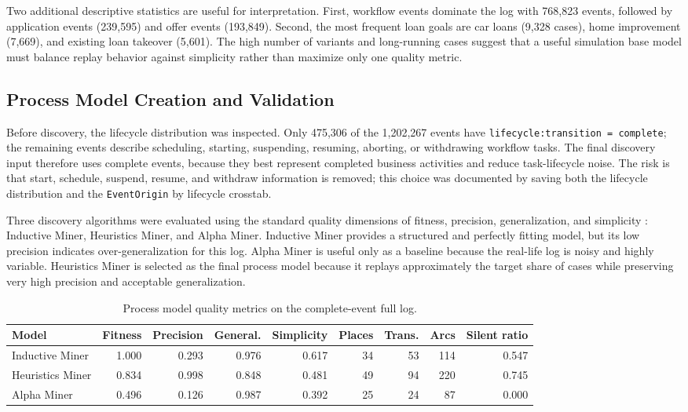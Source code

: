 \documentclass[
  english,
  font=times,
  twocolumn,
]{tumarticle}
\begin{document}
Two additional descriptive statistics are useful for interpretation.
First, workflow events dominate the log with 768,823 events, followed by application events (239,595) and offer events (193,849).
Second, the most frequent loan goals are car loans (9,328 cases), home improvement (7,669), and existing loan takeover (5,601).
The high number of variants and long-running cases suggest that a useful simulation base model must balance replay behavior against simplicity rather than maximize only one quality metric.

\subsection{Process Model Creation and Validation}

Before discovery, the lifecycle distribution was inspected.
Only 475,306 of the 1,202,267 events have \texttt{lifecycle:transition = complete}; the remaining events describe scheduling, starting, suspending, resuming, aborting, or withdrawing workflow tasks.
The final discovery input therefore uses complete events, because they best represent completed business activities and reduce task-lifecycle noise.
The risk is that start, schedule, suspend, resume, and withdraw information is removed; this choice was documented by saving both the lifecycle distribution and the \texttt{EventOrigin} by lifecycle crosstab.

Three discovery algorithms were evaluated using the standard quality dimensions of fitness, precision, generalization, and simplicity \cite{vanderAalst2016process,carmona2018conformance}: Inductive Miner, Heuristics Miner, and Alpha Miner.
Inductive Miner provides a structured and perfectly fitting model, but its low precision indicates over-generalization for this log.
Alpha Miner is useful only as a baseline because the real-life log is noisy and highly variable.
Heuristics Miner is selected as the final process model because it replays approximately the target share of cases while preserving very high precision and acceptable generalization.

\begin{table}[t]
    \caption{Process model quality metrics on the complete-event full log.}
    \centering
    \small
    \begin{tabular}{lrrrrrrrr}
        \toprule
        \textbf{Model} & \textbf{Fitness} & \textbf{Precision} & \textbf{General.} & \textbf{Simplicity} & \textbf{Places} & \textbf{Trans.} & \textbf{Arcs} & \textbf{Silent ratio} \\
        \midrule
        Inductive Miner & 1.000 & 0.293 & 0.976 & 0.617 & 34 & 53 & 114 & 0.547 \\
        Heuristics Miner & 0.834 & 0.998 & 0.848 & 0.481 & 49 & 94 & 220 & 0.745 \\
        Alpha Miner & 0.496 & 0.126 & 0.987 & 0.392 & 25 & 24 & 87 & 0.000 \\
        \bottomrule
    \end{tabular}
    \label{tab:modelquality}
\end{table}
\end{document}
